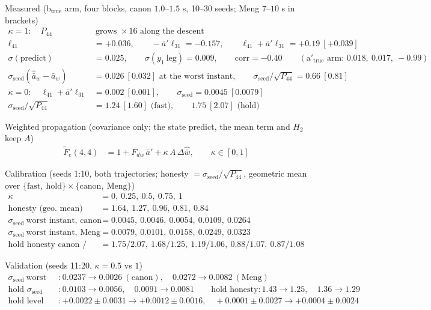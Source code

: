 \documentclass[11pt,a4paper,fontset=none]{ctexart}
\newcommand{\ba}{\bar{a}}
\newcommand{\bw}{\bar{w}}
\newcommand{\dWh}{\Delta\hat{\bw}}
\newcommand{\ap}{\ba'}
\begin{document}
Measured (b$_{\mathrm{true}}$ arm, four blocks, canon $1.0$--$1.5$ s, 10--30 seeds; Meng $7$--$10$ s in brackets)
\begin{align*}
\kappa = 1:\quad P_{44} &\ \text{grows } \times 16 \text{ along the descent} \\
\ell_{41} &= +0.036 , \qquad -\ap\ell_{31} = -0.157 , \qquad \ell_{41} + \ap\ell_{31} = +0.19\ [+0.039] \\
\sigma(\text{predict}) &= 0.025 , \qquad \sigma(y_1\ \text{leg}) = 0.009 , \qquad \text{corr} = -0.40
  \qquad (\text{a}'_{\mathrm{true}}\text{ arm: } 0.018,\ 0.017,\ -0.99) \\
\sigma_{\mathrm{seed}}(\hat{\ba}_w - \ba_w) &= 0.026\ [0.032] \text{ at the worst instant} , \qquad
  \sigma_{\mathrm{seed}}/\sqrt{P_{44}} = 0.66\ [0.81] \\
\kappa = 0:\quad \ell_{41} + \ap\ell_{31} &= 0.002\ [0.001] , \qquad \sigma_{\mathrm{seed}} = 0.0045\ [0.0079] \\
\sigma_{\mathrm{seed}}/\sqrt{P_{44}} &= 1.24\ [1.60] \text{ (fast)} , \qquad 1.75\ [2.07] \text{ (hold)}
\end{align*}

Weighted propagation (covariance only; the state predict, the mean term and $H_2$ keep $A$)
\begin{align*}
\tilde{F}_e(4,4) &= 1 + F_{dw}\,\ap + \kappa\,A\,\dWh , \qquad \kappa \in [0, 1]
\end{align*}

Calibration (seeds 1:10, both trajectories; honesty $= \sigma_{\mathrm{seed}}/\sqrt{P_{44}}$, geometric mean over $\{\text{fast},\ \text{hold}\}\times\{\text{canon},\ \text{Meng}\}$)
\begin{align*}
\kappa &= 0,\ 0.25,\ 0.5,\ 0.75,\ 1 \\
\text{honesty (geo.\ mean)} &= 1.64,\ 1.27,\ \mathbf{0.96},\ 0.81,\ 0.84 \\
\sigma_{\mathrm{seed}}\ \text{worst instant, canon} &= 0.0045,\ 0.0046,\ \mathbf{0.0054},\ 0.0109,\ 0.0264 \\
\sigma_{\mathrm{seed}}\ \text{worst instant, Meng} &= 0.0079,\ 0.0101,\ \mathbf{0.0158},\ 0.0249,\ 0.0323 \\
\text{hold honesty canon / Meng} &= 1.75/2.07,\ 1.68/1.25,\ \mathbf{1.19/1.06},\ 0.88/1.07,\ 0.87/1.08
\end{align*}

Validation (seeds 11:20, $\kappa = 0.5$ vs $1$)
\begin{align*}
\sigma_{\mathrm{seed}}\ \text{worst instant} &: 0.0237 \to 0.0026\ (\text{canon}),\quad 0.0272 \to 0.0082\ (\text{Meng}) \\
\text{hold } \sigma_{\mathrm{seed}} &: 0.0103 \to 0.0056,\quad 0.0091 \to 0.0081 \qquad
\text{hold honesty}: 1.43 \to 1.25,\quad 1.36 \to 1.29 \\
\text{hold level} &: +0.0022 \pm 0.0031 \to +0.0012 \pm 0.0016,\quad +0.0001 \pm 0.0027 \to +0.0004 \pm 0.0024
\end{align*}
\end{document}
